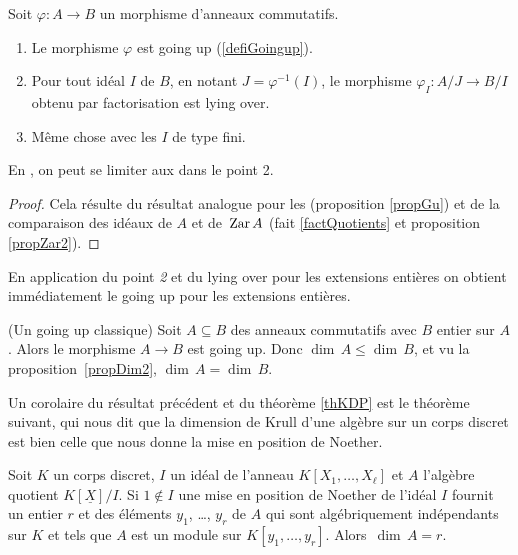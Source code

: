 \begin{lemma} 
\label{lemGU2} Soit $\varphi:A\to B$ un morphisme d'anneaux commutatifs. 
\Propeq
%
\begin{enumerate}
%
\item Le morphisme $\varphi$ est going up (\dfn \ref{defiGoingup}).
%
\item Pour tout idéal $I$ de $B$, en notant $J=\varphi^{-1}(I)$, le morphisme
$\varphi_I:A/J\to B/I$ obtenu par factorisation est lying over. 
%
\item Même chose avec les $I$  de type fini.
%
\end{enumerate}
En \clama, on peut se limiter aux \ideps dans le point 2.
\end{lemma}
%
\begin{proof}
Cela résulte du résultat  analogue pour les \trdis (proposition \ref{propGu}) et de la comparaison des idéaux de $A$ et de $\,{\rm Zar}\,A$ (fait \ref{factQuotients} et proposition \ref{propZar2}). 
\end{proof}
%

En application du point \emph{2} et du lying over pour les extensions entières on obtient immédiatement le going up pour les extensions entières.
\begin{corollary} 
\label{corLy1} 
{\rm (Un going up classique)} Soit $A\subseteq B$ des anneaux commutatifs avec $B$ 
entier sur $A$. Alors le morphisme $A\to B$ est going up. %
Donc $\dim\, A\leq \dim\, B$, et vu la proposition~\ref{propDim2}, $\dim\, A= \dim\, B$.
\end{corollary}


Un corolaire du résultat précédent et du théorème \ref{thKDP} 
est le théorème suivant, qui nous dit que la dimension de Krull d'une 
algèbre \pf sur un corps discret est bien celle que nous donne la mise 
en position de Noether.
\begin{theorem} 
\label{thKDP2} Soit $K$ un corps discret,  $I$ un idéal \tf de l'anneau 
$K[X_1,\ldots,X_\ell]$ et $A$ l'algèbre quotient $K[\underline{X}]/I$. 
Si $1\notin I$ une mise en position de Noether de l'idéal $I$ 
fournit un entier $r$  et des éléments $y_1$, \ldots, $y_r$ de $A$ qui 
sont algébriquement indépendants sur $K$ et tels que $A$ est
un module \tf sur $K[y_1,\ldots,y_r]$. Alors~$\dim\,A=r$.
\end{theorem}

